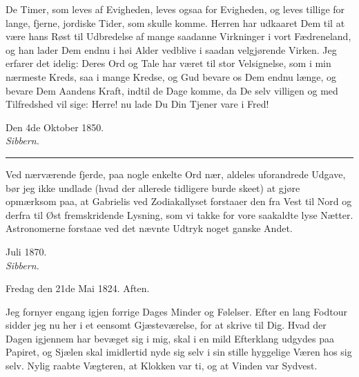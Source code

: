 \documentclass[12pt,a4paper]{book}
\newcommand{\apage}[1]{\marginnote{\footnotesize\textit{[#1]}}}
\begin{document}
De Timer, som leves af Evigheden, leves ogsaa for Evigheden, og leves
tillige for lange, fjerne, jordiske Tider, som skulle komme. Herren har
udkaaret Dem til at være hans Røst til Udbredelse af mange saadanne
Virkninger i vort Fædreneland, og han lader Dem endnu i høi Alder
vedblive i saadan velgjørende Virken. Jeg erfarer det idelig: Deres Ord
og Tale har været til stor Velsignelse, som i min nærmeste Kreds, saa i
mange Kredse, og Gud bevare os Dem endnu længe, og bevare Dem Aandens
Kraft, indtil de Dage komme, da De selv villigen og med Tilfredshed vil
sige: Herre! nu lade Du Din Tjener vare i Fred!

\begin{flushright}
Den 4de Oktober 1850.\\
\textit{Sibbern.}
\end{flushright}

\begin{center}\rule{0.18\linewidth}{0.4pt}\end{center}

Ved nærværende fjerde, paa nogle enkelte Ord nær, aldeles uforandrede
Udgave, bør jeg ikke undlade (hvad der allerede tidligere burde skeet)
at gjøre opmærksom paa, at Gabrielis ved Zodiakallyset forstaaer den
fra Vest til Nord og derfra til Øst fremskridende Lysning, som vi takke
for vore saakaldte lyse Nætter. Astronomerne forstaae ved det nævnte
Udtryk noget ganske Andet.

\begin{flushright}
Juli 1870.\\
\textit{Sibbern.}
\end{flushright}

\cleardoublepage

\cleardoublepage
{}

\begin{center}
Fredag  \apage{1} den 21de Mai 1824. Aften.
\end{center}
\medskip

Jeg fornyer engang igjen forrige Dages Minder og Følelser. Efter en
lang Fodtour sidder jeg nu her i et eensomt Gjæsteværelse, for at skrive
til Dig. Hvad der Dagen igjennem har bevæget sig i mig, skal i en mild
Efterklang udgydes paa Papiret, og Sjælen skal imidlertid nyde sig selv
i sin stille hyggelige Væren hos sig selv. Nylig raabte Vægteren, at
Klokken var ti, og at Vinden var Sydvest.
\end{document}
